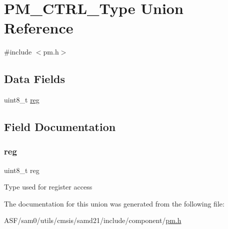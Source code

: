 \hypertarget{union_p_m___c_t_r_l___type}{}\section{P\+M\+\_\+\+C\+T\+R\+L\+\_\+\+Type Union Reference}
\label{union_p_m___c_t_r_l___type}


{\ttfamily \#include $<$pm.\+h$>$}

\subsection*{Data Fields}
\begin{DoxyCompactItemize}
\item 
uint8\+\_\+t \mbox{\hyperlink{union_p_m___c_t_r_l___type_a9428adc9af4653a2050e2536b55dec8d}{reg}}
\end{DoxyCompactItemize}


\subsection{Field Documentation}
\mbox{\label{union_p_m___c_t_r_l___type_a9428adc9af4653a2050e2536b55dec8d}} 
\subsubsection{\texorpdfstring{reg}{reg}}
{\footnotesize\ttfamily uint8\+\_\+t reg}

Type used for register access 

The documentation for this union was generated from the following file\+:\begin{DoxyCompactItemize}
\item 
A\+S\+F/sam0/utils/cmsis/samd21/include/component/\mbox{\hyperlink{component_2pm_8h}{pm.\+h}}\end{DoxyCompactItemize}
